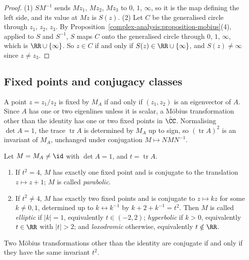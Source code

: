 \begin{proof}
(1) $SM^{-1}$ sends $Mz_1$, $Mz_2$, $Mz_3$ to $0$, $1$, $\infty$, so it is the map defining the left side, and its value at $Mz$ is $S(z)$. (2) Let $C$ be the generalised circle through $z_1$, $z_2$, $z_3$. By
Proposition~\ref{complex-analysis:proposition-mobius}(4), applied to $S$ and $S^{-1}$, $S$ maps $C$ onto the generalised circle through $0$, $1$, $\infty$, which is $\RR \cup \{\infty\}$. So $z \in C$ if and only if
$S(z) \in \RR \cup \{\infty\}$, and $S(z) \neq \infty$ since $z \neq z_3$.
\end{proof}

\subsection{Fixed points and conjugacy classes}\label{complex-analysis:subsection-mobius-classification}

A point $z = z_1/z_2$ is fixed by $M_A$ if and only if $(z_1, z_2)$ is an eigenvector of $A$. Since $A$ has one or two eigenlines unless it is scalar, a M\"obius transformation other than the identity has one or two
fixed points in $\hat{\CC}$. Normalising $\det A = 1$, the trace $\operatorname{tr}A$ is determined by $M_A$ up to sign, so $(\operatorname{tr}A)^2$ is an invariant of $M_A$, unchanged under
conjugation $M \mapsto NMN^{-1}$.

\begin{theorem}\label{complex-analysis:theorem-mobius-classification}
Let $M = M_A \neq \id$ with $\det A = 1$, and $t = \operatorname{tr}A$.
\begin{enumerate}
\item If $t^2 = 4$, $M$ has exactly one fixed point and is conjugate to the translation $z \mapsto z + 1$; $M$ is called \emph{parabolic}.
\item If $t^2 \neq 4$, $M$ has exactly two fixed points and is conjugate to $z \mapsto kz$ for some $k \neq 0, 1$, determined up to $k \leftrightarrow k^{-1}$ by $k + 2 + k^{-1} = t^2$. Then $M$ is called \emph{elliptic} if
$|k| = 1$, equivalently $t \in (-2, 2)$; \emph{hyperbolic} if $k > 0$, equivalently $t \in \RR$ with $|t| > 2$; and \emph{loxodromic} otherwise, equivalently $t \notin \RR$.
\end{enumerate}
Two M\"obius transformations other than the identity are conjugate if and only if they have the same invariant $t^2$.
\end{theorem}

